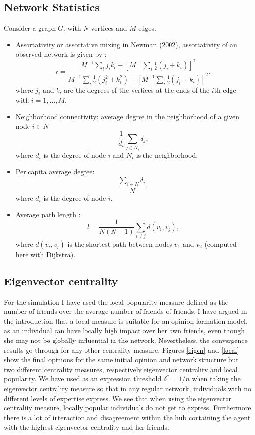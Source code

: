 \documentclass{article}
\begin{document}
\subsection{Network Statistics} \label{networkstat}
Consider a graph $G$, with $N$ vertices and $M$ edges.
\begin{itemize}
\item Assortativity or assortative mixing in Newman (2002)\cite{newman2002}, assortativity of an observed network is given by : 
$$ r =\frac{M^{-1} \sum_{i} j_i k_i - [M^{-1} \sum_i \frac{1}{2} (j_i + k_i)]^2}{M^{-1} \sum_i \frac{1}{2} (j_i^2 + k_i^2) - [M^{-1} \sum_i \frac{1}{2} (j_i + k_i)]^2},$$
where $j_i$ and $k_i$ are the degrees of the vertices at the ends of the $i$th edge with $i=1, \ldots , M$. 
\item Neighborhood connectivity: average degree in the neighborhood of a given node $ i \in N$ $$ \frac{1}{d_i} \sum_{j \in N_i} d_j ,$$
where $d_i$ is the degree of node $i$ and $N_i$ is the neighborhood. 
\item Per capita average degree: 
$$ \frac{\sum_{i \in N } d_i }{N},$$
where $d_i$ is the degree of node $i$. 
\item Average path length :
$$ l=\frac{1}{N (N-1)} \sum_{i \neq j } d(v_i,v_j) ,$$
where $d(v_i,v_j)$ is the shortest path between nodes $v_1$ and $v_2$ (computed here with Dijkstra). 

\end{itemize}

\subsection{Eigenvector centrality}

For the simulation I have used the local popularity measure defined as the number of friends over the average number of friends of friends. I have argued in the introduction that a local measure is suitable for an opinion formation model, as an individual can have locally high impact over her own friends, even though she may not be globally influential in the network. Nevertheless, the convergence results go through for any other centrality measure. Figures \ref{eigen} and \ref{local} show the final opinions for the same initial opinion and network structure but two different centrality measures, respectively eigenvector centrality and local popularity. We have used as an expression threshold $\delta^{*}=1/n$ when taking the eigenvector centrality measure so that in any regular network, individuals with no different levels of expertise express. We see that when using the eigenvector centrality measure, locally popular individuals do not get to express. Furthermore there is a lot of interaction and disagreement within the hub containing the agent with the highest eigenvector centrality and her friends. 
\end{document}

